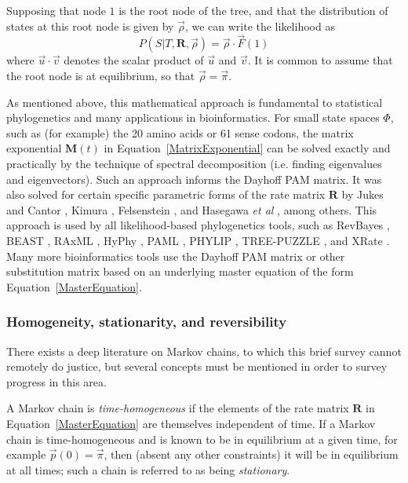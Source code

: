 \documentclass{bmcart}
\newcommand{\matr}[1]{\mathbf{#1}}
\newcommand{\eqref}[1]{Equation~\ref{#1}}
\newcommand{\statespace}{\Phi}
\newcommand{\statevec}{\vec{p}}
\newcommand{\ratematrix}{\matr{R}}
\newcommand{\eqmvec}{\vec{\pi}}
\newcommand{\condmatrix}{\matr{M}}
\newcommand{\felsvec}{\vec{F}}
\newcommand{\scalarprod}{\cdot}
\newcommand{\initvec}{\vec{\rho}}
\begin{document}
Supposing that node $1$ is the root node of the tree,
and that the distribution of states at this root node is given by $\initvec$,
we can write the likelihood as
\begin{equation}
P(S|T,\ratematrix,\initvec) = \initvec \scalarprod \felsvec(1)
\label{Likelihood}
\end{equation}
where $\vec{u} \scalarprod \vec{v}$ denotes the scalar product of $\vec{u}$ and $\vec{v}$.
It is common to assume that the root node is at equilibrium,
so that $\initvec = \eqmvec$.

As mentioned above, this mathematical approach is fundamental to statistical phylogenetics
and many applications in bioinformatics.
For small state spaces $\statespace$, such as (for example) the 20 amino acids or 61 sense codons,
the matrix exponential $\condmatrix(t)$ in \eqref{MatrixExponential} can be solved exactly and practically
by the technique of spectral decomposition (i.e. finding eigenvalues and eigenvectors).
Such an approach informs the Dayhoff PAM matrix.
It was also solved for certain specific parametric forms of the rate matrix $\ratematrix$
by Jukes and Cantor \cite{JukesCantor69}, Kimura \cite{Kimura80}, Felsenstein \cite{Felsenstein81},
and Hasegawa {\em et al} \cite{HasegawaEtal85}, among others.
This approach is used by all likelihood-based phylogenetics tools, such as
RevBayes \cite{HohnaEtAl2016},
BEAST \cite{pmid17996036},
RAxML \cite{pmid16928733},
HyPhy \cite{pmid15509596},
PAML \cite{pmid17483113},
PHYLIP \cite{Felsenstein1989},
TREE-PUZZLE \cite{pmid11934758},
and XRate \cite{pmid22693624}.
Many more bioinformatics tools use the Dayhoff PAM matrix or other substitution matrix
based on an underlying master equation of the form \eqref{MasterEquation}.

\color{red}
\subsubsection*{Homogeneity, stationarity, and reversibility}

There exists a deep literature on Markov chains, to which this brief survey cannot remotely do justice,
but several concepts must be mentioned in order to survey progress in this area.

A Markov chain is {\em time-homogeneous} if the elements of the
rate matrix $\ratematrix$ in \eqref{MasterEquation} are themselves independent of time.
If a Markov chain is time-homogeneous and is known to be in equilibrium at a given time,
for example $\statevec(0) = \eqmvec$,
then (absent any other constraints) it will be in equilibrium at all times;
such a chain is referred to as being {\em stationary}.
\end{document}
